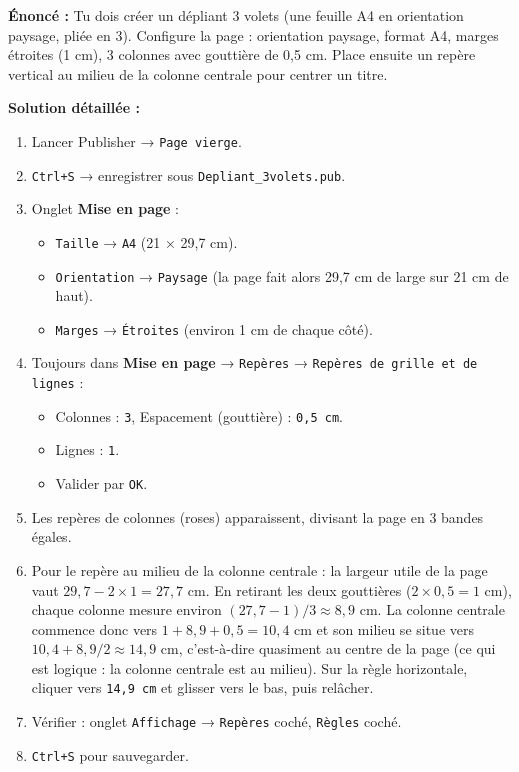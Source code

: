 \documentclass[11pt]{article}
\begin{document}
\begin{exoresolu}
\textbf{Énoncé :} Tu dois créer un dépliant 3 volets (une feuille A4 en orientation paysage, pliée en 3). Configure la page : orientation paysage, format A4, marges étroites (1 cm), 3 colonnes avec gouttière de 0,5 cm. Place ensuite un repère vertical au milieu de la colonne centrale pour centrer un titre.

\tcblower
\textbf{Solution détaillée :}
\begin{enumerate}
    \item Lancer Publisher → \texttt{Page vierge}.
    \item \texttt{Ctrl+S} → enregistrer sous \texttt{Depliant\_3volets.pub}.
    \item Onglet \textbf{Mise en page} :
    \begin{itemize}
        \item \texttt{Taille} → \texttt{A4} (21 × 29,7 cm).
        \item \texttt{Orientation} → \texttt{Paysage} (la page fait alors 29,7 cm de large sur 21 cm de haut).
        \item \texttt{Marges} → \texttt{Étroites} (environ 1 cm de chaque côté).
    \end{itemize}
    \item Toujours dans \textbf{Mise en page} → \texttt{Repères} → \texttt{Repères de grille et de lignes} :
    \begin{itemize}
        \item Colonnes : \texttt{3}, Espacement (gouttière) : \texttt{0,5 cm}.
        \item Lignes : \texttt{1}.
        \item Valider par \texttt{OK}.
    \end{itemize}
    \item Les repères de colonnes (roses) apparaissent, divisant la page en 3 bandes égales.
    \item Pour le repère au milieu de la colonne centrale : la largeur utile de la page vaut $29,7 - 2 \times 1 = 27,7$ cm. En retirant les deux gouttières ($2 \times 0,5 = 1$ cm), chaque colonne mesure environ $(27,7 - 1) / 3 \approx 8,9$ cm. La colonne centrale commence donc vers $1 + 8,9 + 0,5 = 10,4$ cm et son milieu se situe vers $10,4 + 8,9/2 \approx 14,9$ cm, c'est-à-dire quasiment au centre de la page (ce qui est logique : la colonne centrale est au milieu). Sur la règle horizontale, cliquer vers \texttt{14,9 cm} et glisser vers le bas, puis relâcher.
    \item Vérifier : onglet \texttt{Affichage} → \texttt{Repères} coché, \texttt{Règles} coché.
    \item \texttt{Ctrl+S} pour sauvegarder.
\end{enumerate}
\end{exoresolu}
\end{document}
